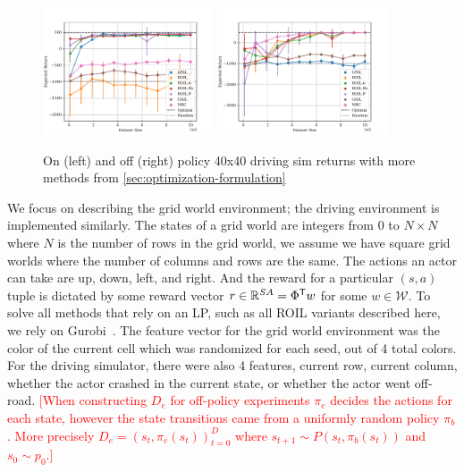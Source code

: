 \documentclass[10pt]{article}
\renewcommand{\cite}{\citep}
\theoremstyle{plain}
\theoremstyle{remark}
\newcommand{\gersi}[1]{\textcolor{red}{[#1]}}
\begin{document}
\begin{figure}
	\centering
	\includegraphics[width=0.45\textwidth]{../src/plots/returns/40x40_driving_on_policy_all_returns.pdf}
	\includegraphics[width=0.45\textwidth]{../src/plots/returns/40x40_driving_off_policy_all_returns.pdf}
	\caption{On (left) and off (right) policy 40x40 driving sim returns with more methods from \cref{sec:optimization-formulation}}
	\label{fig:more_methods_driving}
\end{figure}

We focus on describing the grid world environment; the driving environment is implemented similarly. The states of a grid world are integers from 0 to $N\times N$ where $N$ is the number of rows in the grid world, we assume we have square grid worlds where the number of columns and rows are the same. The actions an actor can take are up, down, left, and right. And the reward for a particular $(s,a)$ tuple is dictated by some reward vector $r \in \mathbb{R}^{SA} = \Phi^{\mathsf{T}} w$ for some $w \in \mathcal{W}$. To solve all methods that rely on an LP, such as all ROIL variants described here, we rely on Gurobi~\cite{gurobi}. The feature vector for the grid world environment was the color of the current cell which was randomized for each seed, out of 4 total colors. For the driving simulator, there were also 4 features, current row, current column, whether the actor crashed in the current state, or whether the actor went off-road. \gersi{When constructing $D_e$ for off-policy experiments $\pi_e$ decides the actions for each state, however the state transitions came from a uniformly random policy $\pi_b$. More precisely $D_e = (s_t, \pi_e(s_t))_{t=0}^{D}$ where $s_{t+1} \sim P(s_t, \pi_b(s_t))$ and $s_0 \sim p_0$.}
\end{document}
